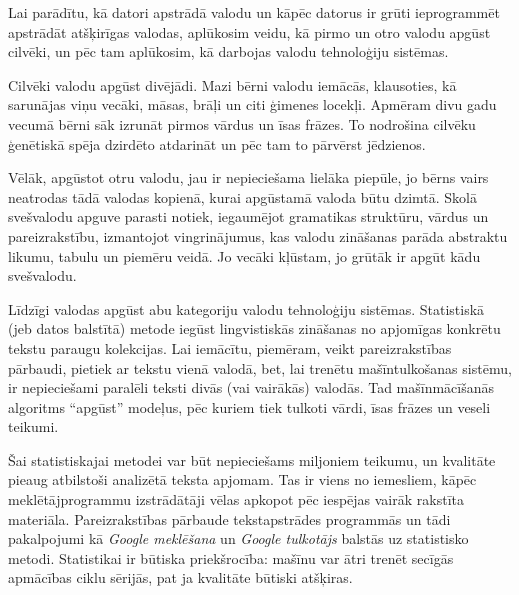 \begin{multicols}{2}
Lai parādītu, kā datori apstrādā valodu un kāpēc datorus ir grūti ieprogrammēt apstrādāt atšķirīgas valodas, aplūkosim veidu, kā pirmo un otro valodu apgūst cilvēki, un pēc tam aplūkosim, kā darbojas valodu tehnoloģiju sistēmas. 

Cilvēki valodu apgūst divējādi.
Mazi bērni valodu iemācās, klausoties, kā sarunājas viņu vecāki, māsas, brāļi un citi ģimenes locekļi. 
Apmēram divu gadu vecumā bērni sāk izrunāt pirmos vārdus un īsas frāzes. 
To nodrošina cilvēku ģenētiskā spēja dzirdēto atdarināt un pēc tam to pārvērst jēdzienos. 


Vēlāk, apgūstot otru valodu, jau ir nepieciešama lielāka piepūle, jo bērns vairs neatrodas tādā valodas kopienā, kurai apgūstamā valoda būtu dzimtā. 
Skolā svešvalodu apguve parasti notiek, iegaumējot gramatikas struktūru, vārdus un pareizrakstību, izmantojot vingrinājumus, kas valodu zināšanas parāda abstraktu likumu, tabulu un piemēru veidā. 
Jo vecāki kļūstam, jo grūtāk ir apgūt kādu svešvalodu.

Līdzīgi valodas apgūst abu kategoriju valodu tehnoloģiju sistēmas.
Statistiskā (jeb datos balstītā) metode iegūst lingvistiskās zināšanas no apjomīgas konkrētu tekstu paraugu kolekcijas. 
Lai iemācītu, piemēram, veikt pareizrakstības pārbaudi, pietiek ar tekstu vienā valodā, bet, lai trenētu mašīntulkošanas sistēmu, ir nepieciešami paralēli teksti divās (vai vairākās) valodās. 
Tad mašīnmācīšanās algoritms ``apgūst'' modeļus, pēc kuriem tiek tulkoti vārdi, īsas frāzes un veseli teikumi. 


Šai statistiskajai metodei var būt nepieciešams miljoniem teikumu, un kvalitāte pieaug atbilstoši analizētā teksta apjomam. 
Tas ir viens no iemesliem, kāpēc meklētājprogrammu izstrādātāji vēlas apkopot pēc iespējas vairāk rakstīta materiāla. 
Pareizrakstības pārbaude tekstapstrādes programmās un tādi pakalpojumi kā \textit{Google meklēšana} un \textit{Google tulkotājs} balstās uz statistisko metodi. 
Statistikai ir būtiska priekšrocība: mašīnu var ātri trenēt secīgās apmācības ciklu sērijās, pat ja kvalitāte būtiski atšķiras.


\end{multicols}
